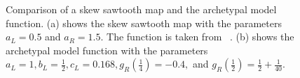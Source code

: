\begin{figure}
	\centering
	\caption[Comparison of a skew sawtooth map and the archetypal model function]{
		Comparison of a skew sawtooth map and the archetypal model function.
		(a) shows the skew sawtooth map with the parameters $a_L = 0.5$ and $a_R = 1.5$.
		The function is taken from ~\cite{simpson2018saw}.
		(b) shows the archetypal model function with the parameters $a_L = 1, b_L = \frac{1}{2}, c_L = 0.168, g_R\left(\frac{1}{4}\right) = -0.4 ,$ and $g_R\left(\frac{1}{2}\right) = \frac{1}{2} + \frac{1}{40}$.
	}
	\label{fig:add.saw.vs.arch}
\end{figure}


